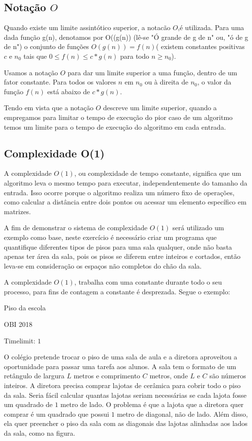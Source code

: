 \subsection*{Notação $O$}
    Quando existe um limite assintótico superior, a notacão $O$,é utilizada. Para uma dada função g(n), denotamos por O((g(n)) (lê-se "Ó grande de g de n" ou, "ó de g de n") o conjunto de funções $O(g(n)) =f(n)$( existem constantes positivas $c$ e $n_0$ tais que $0\leq f(n) \leq c*g(n)$ para todo $ n \geq n_0$).
    
Usamos a notação $O$ para dar um limite superior a uma função, dentro de um fator constante. Para todos os valores $n$ em $n_0$ ou à direita de $n_0$, o valor da função $f(n)$ está abaixo de $c*g(n)$.

 Tendo em vista que a notação $O$ descreve um limite superior, quando a empregamos para limitar o tempo de execução do pior caso de um algoritmo temos um limite para o tempo de execução do algoritmo em cada entrada\cite{AlgoritmoCormen2009}.




\subsection{Complexidade O(1)}

A complexidade $O(1)$, ou complexidade de tempo constante, significa que um algoritmo leva o mesmo tempo para executar, independentemente do tamanho da entrada. Isso ocorre porque o algoritmo realiza um número fixo de operações, como calcular a distância entre dois pontos ou acessar um elemento específico em matrizes.

A fim de  demonstrar o sistema de complexidade $O(1)$ será utilizado um exemplo como base, neste exercício  é necessário criar um programa que quantifique diferentes tipos de pisos para uma sala qualquer, onde não basta apenas ter área da sala, pois os pisos se diferem entre inteiros e cortados, então leva-se em consideração os espaços não completos do chão da sala.

A complexidade $O(1)$, trabalha com uma constante durante todo o seu processo, para fins de contagem a constante é desprezada.
Segue o exemplo:
\newpage
\begin{center}
Piso da escola

{ OBI 2018}

Timelimit: $1$	
\end{center}

 O colégio pretende trocar o piso de uma sala de aula e a diretora aproveitou a oportunidade para passar uma tarefa aos alunos. A sala tem o formato de um retângulo de largura $L$ metros e comprimento $C$ metros, onde $L$ e $C$ são números inteiros. A diretora precisa comprar lajotas de cerâmica para cobrir todo o piso da sala. Seria fácil calcular quantas lajotas seriam necessárias se cada lajota fosse um quadrado de $1$ metro de lado. O problema é que a lajota que a diretora quer comprar é um quadrado que possui $1$ metro de diagonal, não de lado. Além disso, ela quer preencher o piso da sala com as diagonais das lajotas alinhadas aos lados da sala, como na figura.

